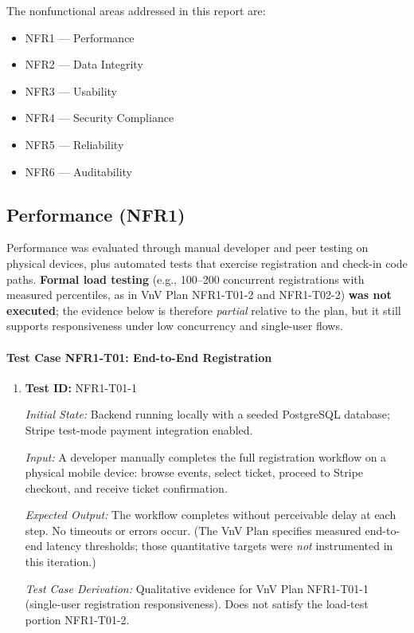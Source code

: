 \documentclass[12pt, titlepage]{article}
\begin{document}
The nonfunctional areas addressed in this report are:

\begin{itemize}
\item NFR1 --- Performance
\item NFR2 --- Data Integrity
\item NFR3 --- Usability
\item NFR4 --- Security Compliance
\item NFR5 --- Reliability
\item NFR6 --- Auditability
\end{itemize}


\subsection{Performance (NFR1)}

Performance was evaluated through manual developer and peer testing on physical devices, plus automated tests that exercise registration and check-in code paths. \textbf{Formal load testing} (e.g., 100--200 concurrent registrations with measured percentiles, as in VnV Plan NFR1-T01-2 and NFR1-T02-2) \textbf{was not executed}; the evidence below is therefore \emph{partial} relative to the plan, but it still supports responsiveness under low concurrency and single-user flows.

\paragraph{Test Case NFR1-T01: End-to-End Registration}

\begin{enumerate}

\item \textbf{Test ID:} NFR1-T01-1

\textit{Initial State:} Backend running locally with a seeded PostgreSQL database; Stripe test-mode payment integration enabled.

\textit{Input:} A developer manually completes the full registration workflow on a physical mobile device: browse events, select ticket, proceed to Stripe checkout, and receive ticket confirmation.

\textit{Expected Output:} The workflow completes without perceivable delay at each step. No timeouts or errors occur. (The VnV Plan specifies measured end-to-end latency thresholds; those quantitative targets were \emph{not} instrumented in this iteration.)

\textit{Test Case Derivation:} Qualitative evidence for VnV Plan NFR1-T01-1 (single-user registration responsiveness). Does not satisfy the load-test portion NFR1-T01-2.

\end{enumerate}
\end{document}
